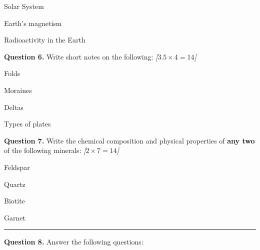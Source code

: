\documentclass[11pt,a4paper]{article}
\newcommand{\pts}[1]{\hfill   \textit{[#1]}}
\begin{document}
\begin{parts}
  \item Solar System
  \item Earth's magnetism
  \item Radioactivity in the Earth
\end{parts}

\medskip


\noindent   \textbf{Question 6.} Write short notes on the following: \pts{$3.5  \times 4 = 14$}

\begin{parts}
  \item Folds
  \item Moraines
  \item Deltas
  \item Types of plates
\end{parts}

\medskip


\noindent   \textbf{Question 7.} Write the chemical composition and physical properties of   \textbf{any two} of the following minerals: \pts{$2  \times 7 = 14$}

\begin{parts}
  \item Feldspar
  \item Quartz
  \item Biotite
  \item Garnet
\end{parts}

\bigskip


\rule{\linewidth}{0.4pt}\smallskip




\noindent   \textbf{Question 8.} Answer the following questions:
\end{document}
